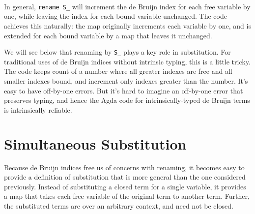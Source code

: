 \begin{fence}
\begin{code}
\AgdaSymbol{=}\AgdaSpace{}%
\AgdaSpace{}%
\AgdaSymbol{(}\AgdaOperator{\AgdaFunction{\#}}\AgdaSpace{}%
\AgdaSpace{}%
\AgdaSpace{}%
\AgdaSymbol{(}\AgdaOperator{\AgdaFunction{\#}}\AgdaSpace{}%
\AgdaSpace{}%
\AgdaSpace{}%
\AgdaOperator{\AgdaFunction{\#}}\AgdaSpace{}%
\AgdaSymbol{))}\<%
\\
%
\\[\AgdaEmptyExtraSkip]%
\>[0]\AgdaFunction{\AgdaUnderscore{}}\AgdaSpace{}%
\AgdaSymbol{:}\AgdaSpace{}%
\AgdaSpace{}%
\AgdaSpace{}%
\AgdaSpace{}%
\AgdaSpace{}%
\<%
\\
\>[0]\AgdaSymbol{\AgdaUnderscore{}}\AgdaSpace{}%
\AgdaSymbol{=}\AgdaSpace{}%
\<%
\end{code}
\end{fence}

In general, \texttt{rename\ S\_} will increment the de Bruijn index for
each free variable by one, while leaving the index for each bound
variable unchanged. The code achieves this naturally: the map originally
increments each variable by one, and is extended for each bound variable
by a map that leaves it unchanged.

We will see below that renaming by \texttt{S\_} plays a key role in
substitution. For traditional uses of de Bruijn indices without
intrinsic typing, this is a little tricky. The code keeps count of a
number where all greater indexes are free and all smaller indexes bound,
and increment only indexes greater than the number. It's easy to have
off-by-one errors. But it's hard to imagine an off-by-one error that
preserves typing, and hence the Agda code for intrinsically-typed de
Bruijn terms is intrinsically reliable.

\hypertarget{simultaneous-substitution}{%
\section{Simultaneous Substitution}\label{simultaneous-substitution}}

Because de Bruijn indices free us of concerns with renaming, it becomes
easy to provide a definition of substitution that is more general than
the one considered previously. Instead of substituting a closed term for
a single variable, it provides a map that takes each free variable of
the original term to another term. Further, the substituted terms are
over an arbitrary context, and need not be closed.

